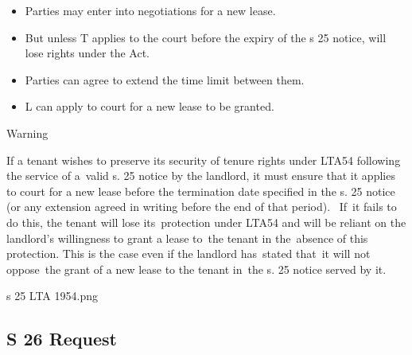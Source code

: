\documentclass[
]{article}
\providecommand{\tightlist}{%
  \setlength{\itemsep}{0pt}\setlength{\parskip}{0pt}}
\newenvironment{env-1183acc6-7dc8-44d4-a985-6dec306e67fd}
{
    \savenotes\tcolorbox[blanker,breakable,left=5pt,borderline west={2pt}{-4pt}{orange}]
}
{
    \endtcolorbox\spewnotes
}
\begin{document}
\begin{itemize}
\tightlist
\item
  Parties may enter into negotiations for a new lease.
\item
  But unless T applies to the court before the expiry of the s 25
  notice, will lose rights under the Act.
\item
  Parties can agree to extend the time limit between them.
\item
  L can apply to court for a new lease to be granted.
\end{itemize}

\begin{env-1183acc6-7dc8-44d4-a985-6dec306e67fd}

Warning

If a tenant wishes to preserve its security of tenure rights under LTA54
following the service of a~valid s. 25 notice by the landlord, it must
ensure that it applies to court for a new lease before the termination
date specified in the s. 25 notice (or any extension agreed in writing
before the end of that period).~ If~it fails to do this, the tenant will
lose its~protection under LTA54 and will be reliant on the landlord's
willingness to grant a lease to~the tenant in the~absence of this
protection. This is the case even if the landlord has~stated that~it
will not oppose~the grant of a new lease to the tenant in~the s. 25
notice served by it.

\end{env-1183acc6-7dc8-44d4-a985-6dec306e67fd}

s 25 LTA 1954.png

\hypertarget{s-26-request}{%
\subsection{S 26 Request}\label{s-26-request}}
\end{document}
